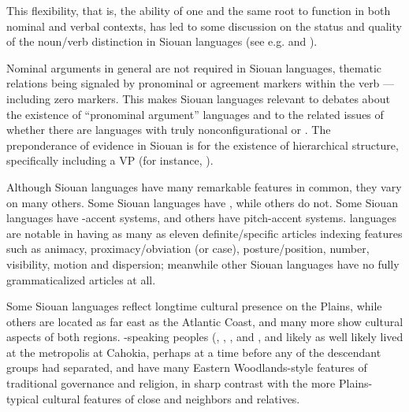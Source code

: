 \begin{refsection}
This flexibility, that is, the ability of one and the same root to function in both nominal and verbal contexts, has led to some discussion on the status and quality of the noun/verb distinction in Siouan languages (see e.g. \citealt{Helmbrecht2002}  and \citet{Ingham2001}). 

Nominal arguments in general are not required in Siouan languages, thematic relations being signaled by pronominal or agreement markers within the verb --- including zero markers. This makes Siouan languages relevant to debates about the existence of ``pronominal argument'' languages \citep{Jelinek1984} and to the related issues of whether there are languages with truly nonconfigurational or . The preponderance of evidence in Siouan is for the existence of hierarchical structure, specifically including a VP (for instance, \citealt{West2003,Johnson2016, JohnsonEtAl2016, Rosen2016}).


Although Siouan languages have many remarkable features in common, they vary on many others.  Some Siouan languages have , while others do not. Some Siouan languages have -accent systems, and others have pitch-accent systems.  languages are notable in having as many as eleven definite/specific articles indexing features such as animacy, proximacy/obviation (or case), posture/position, number, visibility, motion and dispersion; meanwhile other Siouan languages have no fully grammaticalized articles at all.


Some Siouan languages reflect longtime cultural presence on the Plains, while others are located as far east as the Atlantic Coast, and many more show cultural aspects of both regions. -speaking peoples (, , ,  and , and likely  as well \citep{Kasak2016,Koontz1995a} likely lived at the metropolis at Cahokia, perhaps at a time before any of the descendant groups had separated, and have many Eastern Woodlands-style features of traditional governance and religion, in sharp contrast with the more Plains-typical cultural features of close  and  neighbors and relatives.


\end{refsection}
